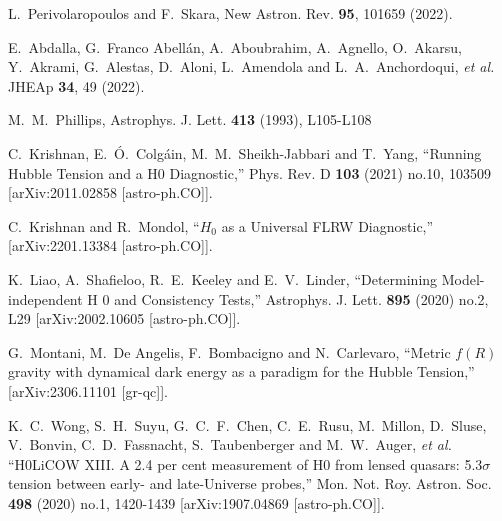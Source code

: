 \documentclass[a4paper,11pt]{article}
\begin{document}
\begin{thebibliography}{99}
L.~Perivolaropoulos and F.~Skara,
New Astron. Rev. \textbf{95}, 101659  (2022).

E.~Abdalla, G.~Franco Abell\'an, A.~Aboubrahim, A.~Agnello, O.~Akarsu, Y.~Akrami, G.~Alestas, D.~Aloni, L.~Amendola and L.~A.~Anchordoqui, \textit{et al.}
JHEAp \textbf{34}, 49  (2022).

M.~M.~Phillips,
Astrophys. J. Lett. \textbf{413} (1993), L105-L108

C.~Krishnan, E.~\'O.~Colg\'ain, M.~M.~Sheikh-Jabbari and T.~Yang,
``Running Hubble Tension and a H0 Diagnostic,''
Phys. Rev. D \textbf{103} (2021) no.10, 103509
[arXiv:2011.02858 [astro-ph.CO]].

C.~Krishnan and R.~Mondol,
``$H_0$ as a Universal FLRW Diagnostic,''
[arXiv:2201.13384 [astro-ph.CO]].

K.~Liao, A.~Shafieloo, R.~E.~Keeley and E.~V.~Linder,
``Determining Model-independent H 0 and Consistency Tests,''
Astrophys. J. Lett. \textbf{895} (2020) no.2, L29
[arXiv:2002.10605 [astro-ph.CO]].

G.~Montani, M.~De Angelis, F.~Bombacigno and N.~Carlevaro,
``Metric $f(R)$ gravity with dynamical dark energy as a paradigm for the Hubble Tension,''
[arXiv:2306.11101 [gr-qc]].

K.~C.~Wong, S.~H.~Suyu, G.~C.~F.~Chen, C.~E.~Rusu, M.~Millon, D.~Sluse, V.~Bonvin, C.~D.~Fassnacht, S.~Taubenberger and M.~W.~Auger, \textit{et al.}
``H0LiCOW \textendash{} XIII. A 2.4 per cent measurement of H0 from lensed quasars: 5.3\ensuremath{\sigma} tension between early- and late-Universe probes,''
Mon. Not. Roy. Astron. Soc. \textbf{498} (2020) no.1, 1420-1439
[arXiv:1907.04869 [astro-ph.CO]].


\end{thebibliography}
\end{document}
